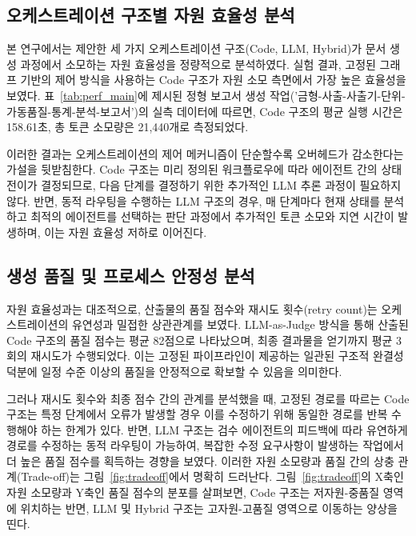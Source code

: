 \subsection{오케스트레이션 구조별 자원 효율성 분석}

본 연구에서는 제안한 세 가지 오케스트레이션 구조(Code, LLM, Hybrid)가 문서 생성 과정에서 소모하는 자원 효율성을 정량적으로 분석하였다. 실험 결과, 고정된 그래프 기반의 제어 방식을 사용하는 Code 구조가 자원 소모 측면에서 가장 높은 효율성을 보였다. 표~\ref{tab:perf_main}에 제시된 정형 보고서 생성 작업('금형-사출-사출기-단위-가동품질-통계-분석-보고서')의 실측 데이터에 따르면, Code 구조의 평균 실행 시간은 158.61초, 총 토큰 소모량은 21,440개로 측정되었다.

이러한 결과는 오케스트레이션의 제어 메커니즘이 단순할수록 오버헤드가 감소한다는 가설을 뒷받침한다. Code 구조는 미리 정의된 워크플로우에 따라 에이전트 간의 상태 전이가 결정되므로, 다음 단계를 결정하기 위한 추가적인 LLM 추론 과정이 필요하지 않다. 반면, 동적 라우팅을 수행하는 LLM 구조의 경우, 매 단계마다 현재 상태를 분석하고 최적의 에이전트를 선택하는 판단 과정에서 추가적인 토큰 소모와 지연 시간이 발생하며, 이는 자원 효율성 저하로 이어진다.

\subsection{생성 품질 및 프로세스 안정성 분석}

자원 효율성과는 대조적으로, 산출물의 품질 점수와 재시도 횟수(retry count)는 오케스트레이션의 유연성과 밀접한 상관관계를 보였다. LLM-as-Judge 방식을 통해 산출된 Code 구조의 품질 점수는 평균 82점으로 나타났으며, 최종 결과물을 얻기까지 평균 3회의 재시도가 수행되었다. 이는 고정된 파이프라인이 제공하는 일관된 구조적 완결성 덕분에 일정 수준 이상의 품질을 안정적으로 확보할 수 있음을 의미한다.

그러나 재시도 횟수와 최종 점수 간의 관계를 분석했을 때, 고정된 경로를 따르는 Code 구조는 특정 단계에서 오류가 발생할 경우 이를 수정하기 위해 동일한 경로를 반복 수행해야 하는 한계가 있다. 반면, LLM 구조는 검수 에이전트의 피드백에 따라 유연하게 경로를 수정하는 동적 라우팅이 가능하여, 복잡한 수정 요구사항이 발생하는 작업에서 더 높은 품질 점수를 획득하는 경향을 보였다. 이러한 자원 소모량과 품질 간의 상충 관계(Trade-off)는 그림~\ref{fig:tradeoff}에서 명확히 드러난다. 그림~\ref{fig:tradeoff}의 X축인 자원 소모량과 Y축인 품질 점수의 분포를 살펴보면, Code 구조는 저자원-중품질 영역에 위치하는 반면, LLM 및 Hybrid 구조는 고자원-고품질 영역으로 이동하는 양상을 띤다.

